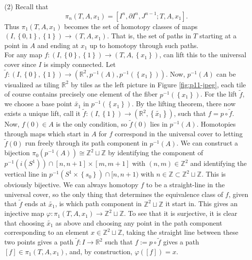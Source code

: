 \begin{solution}
        (2)
        Recall that
        \[
        \pi_n (T,A,x_1) =
        \left[ I^{n},\partial I^{n},
        J^{n-1}; T,A, x_1 \right] .
        \] 
        Thus $\pi_1 \left( T,A,x_1 \right) $ becomes
        the set of homotopy classes
        of maps
        $\left( I, \left\{ 0,1 \right\} , \left\{ 1 \right\} 
        \right) \to \left( T,A,x_1 \right)$. That is, the
        set of paths in $T$ starting at a point in $A$ and
        ending at $x_1$ up to homotopy through such paths.\\
        For any map
        $ f \colon \left( I, \left\{ 0 \right\} , \left\{ 1 \right\} 
        \right) \to \left( T, A, \left\{ x_1 \right\}  \right) $, 
        can lift this to the universal cover since
        $I$ is simply connected. Let
        $\tilde{f} \colon 
        \left( I, \left\{ 0 \right\} , \left\{ 1 \right\}  \right) 
        \to \left( \mathbb{R}^2, 
        p^{-1} (A) , p^{-1}\left( \left\{ x_1 \right\}  \right) 
    \right) $.
    Now, $p^{-1}(A)$ can be visualized as
    tiling $\mathbb{R}^2$ by tiles
    as the left picture in Figure \ref{fig:p11-jpeg}, each
    tile of course contains precisely one
    element of the fiber $p^{-1}\left( 
    \left\{ x_1 \right\} \right) $. For the lift
    $\tilde{f}$, we choose a base point
    $\tilde{x_1}$ in
    $p^{-1}\left( \left\{ x_1 \right\}  \right) $. By
    the lifting theorem, there now exists
    a unique lift, call it $\tilde{f} \colon
    \left( I, \left\{ 1 \right\} 
    \right) \to \left( \mathbb{R}^2, 
    \left\{ \tilde{x_1} \right\} \right) $, such that
    $f = p \circ \tilde{f}$. Now,
    $f(0) \in A$ is the only condition, so
    $\tilde{f}(0)$ lies in $p^{-1}(A)$.
    Homotopies through maps which
    start in $A$ for $f$ correspond in the universal cover
    to letting $\tilde{f}(0)$ run freely through its
    path component in $p^{-1}(A)$. We can
    construct a bijection
    $\pi_0 \left( p^{-1}(A) \right) \cong 
    \mathbb{Z}^2 \sqcup \mathbb{Z}$ by
    identifying the component of
    $p^{-1} \left( i \left( S^{1} \right)  \right) \cap
    \left[ n,n+1 \right] \times \left[ m,m+1 \right] $ with
    $\left( n,m \right) \in \mathbb{Z}^2$ and
    identifying the
    vertical line in
    $p^{-1}\left( S^{1} \times \left\{ s_0 \right\}  \right) 
    \cap [n,n+1)$ with $n \in  \mathbb{Z} \subset 
    \mathbb{Z}^2 \sqcup \mathbb{Z}$. This is obviously bijective.
    We can always homotopy $f$ to be a straight-line in
    the universal cover, so the only thing that determines
    the equivalence class of
    $f$, given that $\tilde{f}$ ends at $\tilde{x_1}$,
    is which path component in
    $\mathbb{Z}^2 \sqcup \mathbb{Z}$ it start in.
    This gives an injective map
    $\varphi \colon \pi_1 \left( T,A,x_1 \right) 
    \to \mathbb{Z}^2 \sqcup \mathbb{Z}$.
    To see that it is surjective, it is clear that
    choosing $\tilde{x_1}$ as above and
    choosing any point in the path component corresponding to
    an element $x \in \mathbb{Z}^2 \sqcup \mathbb{Z}$, taking
    the straight line between these two points gives
    a path $\tilde{f} \colon I \to \mathbb{R}^2$ 
    such that $f := p \circ \tilde{f} $ gives a path
    $\left[ f \right] \in \pi_1 \left( T,A,x_1 \right) $,
    and, by construction,
    $\varphi (\left[ f \right] ) = x$.


\end{solution}
